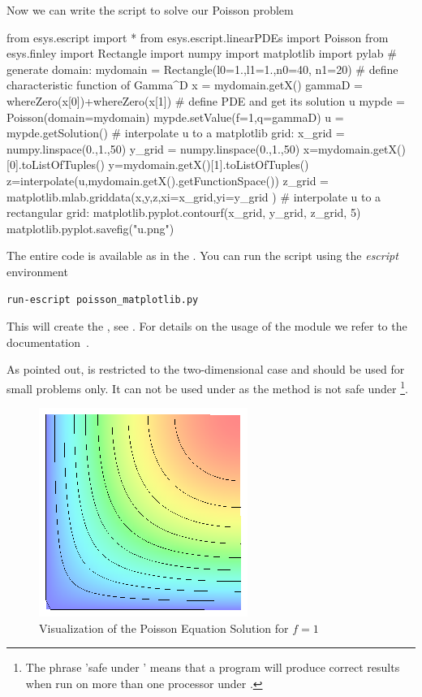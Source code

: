 Now we can write the script to solve our Poisson problem
\begin{python}
  from esys.escript import *
  from esys.escript.linearPDEs import Poisson
  from esys.finley import Rectangle
  import numpy
  import matplotlib
  import pylab
  # generate domain:
  mydomain = Rectangle(l0=1.,l1=1.,n0=40, n1=20)
  # define characteristic function of Gamma^D
  x = mydomain.getX()
  gammaD = whereZero(x[0])+whereZero(x[1])
  # define PDE and get its solution u
  mypde = Poisson(domain=mydomain)
  mypde.setValue(f=1,q=gammaD)
  u = mypde.getSolution()
  # interpolate u to a matplotlib grid:
  x_grid = numpy.linspace(0.,1.,50)
  y_grid = numpy.linspace(0.,1.,50)
  x=mydomain.getX()[0].toListOfTuples()
  y=mydomain.getX()[1].toListOfTuples()
  z=interpolate(u,mydomain.getX().getFunctionSpace())
  z_grid = matplotlib.mlab.griddata(x,y,z,xi=x_grid,yi=y_grid )
  # interpolate u to a rectangular grid:
  matplotlib.pyplot.contourf(x_grid, y_grid, z_grid, 5)
  matplotlib.pyplot.savefig("u.png")
\end{python}
The entire code is available as  in the \ExampleDirectory.
You can run the script using the {\it escript} environment
\begin{verbatim}
run-escript poisson_matplotlib.py
\end{verbatim}
This will create the , see .
For details on the usage of the \MATPLOTLIB module we refer to the documentation~\cite{matplotlib}.

As pointed out, \MATPLOTLIB is restricted to the two-dimensional case and
should be used for small problems only.
It can not be used under \MPI as the  method is not
safe under \MPI\footnote{The phrase 'safe under \MPI' means that a program
will produce correct results when run on more than one processor under \MPI.}.

\begin{figure}
\centerline{\includegraphics[width=\figwidth]{FirstStepResult}}
\caption{Visualization of the Poisson Equation Solution for $f=1$}
\label{fig:FirstSteps.3}
\end{figure}

